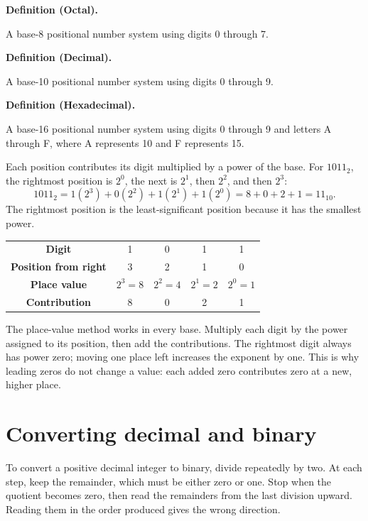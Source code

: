 \documentclass[11pt]{article}
\newenvironment{definitionbox}[1]{%
  \par\noindent\textbf{Definition (#1).}\ \itshape
}{\par\vspace{0.3em}}
\begin{document}
\begin{definitionbox}{Octal}
A base-8 positional number system using digits 0 through 7.
\end{definitionbox}

\begin{definitionbox}{Decimal}
A base-10 positional number system using digits 0 through 9.
\end{definitionbox}

\begin{definitionbox}{Hexadecimal}
A base-16 positional number system using digits 0 through 9 and letters A
through F, where A represents 10 and F represents 15.
\end{definitionbox}

Each position contributes its digit multiplied by a power of the base. For
$1011_2$, the rightmost position is $2^0$, the next is $2^1$, then $2^2$,
and then $2^3$:
\[
1011_2=1(2^3)+0(2^2)+1(2^1)+1(2^0)=8+0+2+1=11_{10}.
\]
The rightmost position is the least-significant position because it has the
smallest power.

\begin{center}
\begin{tabular}{ccccc}
\toprule
\textbf{Digit} & 1 & 0 & 1 & 1\\
\textbf{Position from right} & 3 & 2 & 1 & 0\\
\textbf{Place value} & $2^3=8$ & $2^2=4$ & $2^1=2$ & $2^0=1$\\
\textbf{Contribution} & 8 & 0 & 2 & 1\\
\bottomrule
\end{tabular}
\end{center}

The place-value method works in every base. Multiply each digit by the
power assigned to its position, then add the contributions. The rightmost
digit always has power zero; moving one place left increases the exponent
by one. This is why leading zeros do not change a value: each added zero
contributes zero at a new, higher place.

\section{Converting decimal and binary}
To convert a positive decimal integer to binary, divide repeatedly by two.
At each step, keep the remainder, which must be either zero or one. Stop
when the quotient becomes zero, then read the remainders from the last
division upward. Reading them in the order produced gives the wrong
direction.
\end{document}
